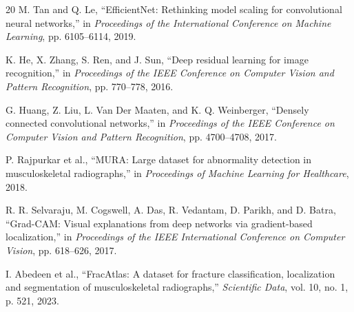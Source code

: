 \documentclass[conference]{IEEEtran}
\begin{document}
\begin{thebibliography}{20}
M. Tan and Q. Le, ``EfficientNet: Rethinking model scaling for convolutional neural networks,'' in \textit{Proceedings of the International Conference on Machine Learning}, pp. 6105--6114, 2019.

K. He, X. Zhang, S. Ren, and J. Sun, ``Deep residual learning for image recognition,'' in \textit{Proceedings of the IEEE Conference on Computer Vision and Pattern Recognition}, pp. 770--778, 2016.

G. Huang, Z. Liu, L. Van Der Maaten, and K. Q. Weinberger, ``Densely connected convolutional networks,'' in \textit{Proceedings of the IEEE Conference on Computer Vision and Pattern Recognition}, pp. 4700--4708, 2017.

P. Rajpurkar et al., ``MURA: Large dataset for abnormality detection in musculoskeletal radiographs,'' in \textit{Proceedings of Machine Learning for Healthcare}, 2018.

R. R. Selvaraju, M. Cogswell, A. Das, R. Vedantam, D. Parikh, and D. Batra, ``Grad-CAM: Visual explanations from deep networks via gradient-based localization,'' in \textit{Proceedings of the IEEE International Conference on Computer Vision}, pp. 618--626, 2017.

I. Abedeen et al., ``FracAtlas: A dataset for fracture classification, localization and segmentation of musculoskeletal radiographs,'' \textit{Scientific Data}, vol. 10, no. 1, p. 521, 2023.

\end{thebibliography}
\end{document}

